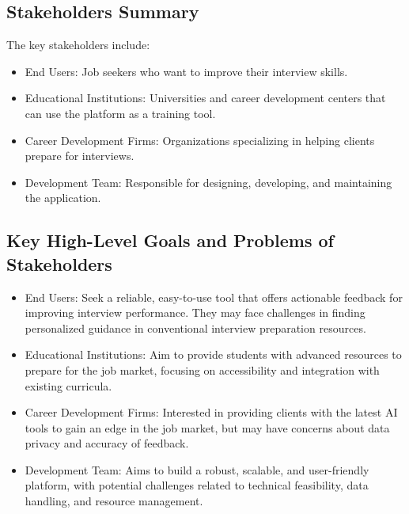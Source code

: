 \subsection{Stakeholders Summary} The key stakeholders include: \begin{itemize} \item End Users: Job seekers who want to improve their interview skills. \item Educational Institutions: Universities and career development centers that can use the platform as a training tool. \item Career Development Firms: Organizations specializing in helping clients prepare for interviews. \item Development Team: Responsible for designing, developing, and maintaining the application. \end{itemize}

\subsection{Key High-Level Goals and Problems of Stakeholders} \begin{itemize} \item End Users: Seek a reliable, easy-to-use tool that offers actionable feedback for improving interview performance. They may face challenges in finding personalized guidance in conventional interview preparation resources. \item Educational Institutions: Aim to provide students with advanced resources to prepare for the job market, focusing on accessibility and integration with existing curricula. \item Career Development Firms: Interested in providing clients with the latest AI tools to gain an edge in the job market, but may have concerns about data privacy and accuracy of feedback. \item Development Team: Aims to build a robust, scalable, and user-friendly platform, with potential challenges related to technical feasibility, data handling, and resource management. \end{itemize}

